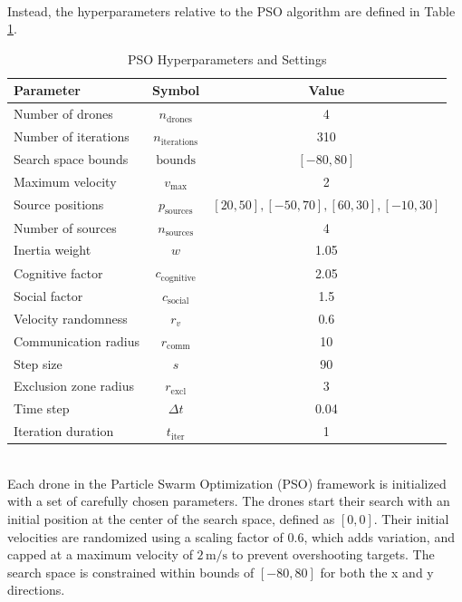\noindent\\
Instead, the hyperparameters relative to the PSO algorithm are
defined in Table \ref{tab:pso_parameters}.
\begin{table}[h!]
\centering
\caption{PSO Hyperparameters and Settings}
\begin{tabular}{|l|c|c|}
\hline
\textbf{Parameter}            & \textbf{Symbol}         & \textbf{Value} \\ \hline
Number of drones             & \(n_{\text{drones}}\)   & 4 \\ \hline
Number of iterations         & \(n_{\text{iterations}}\) & 310 \\ \hline
Search space bounds          & \(\text{bounds}\)       & \([-80, 80]\) \\ \hline
Maximum velocity             & \(v_{\text{max}}\)      & 2 \\ \hline
Source positions             & \(p_{\text{sources}}\)  & \([20, 50], [-50, 70], [60, 30], [-10, 30]\) \\ \hline
Number of sources            & \(n_{\text{sources}}\)  & 4 \\ \hline
Inertia weight               & \(w\)                  & 1.05 \\ \hline
Cognitive factor             & \(c_{\text{cognitive}}\) & 2.05 \\ \hline
Social factor                & \(c_{\text{social}}\)   & 1.5 \\ \hline
Velocity randomness          & \(r_v\)                & 0.6 \\ \hline
Communication radius         & \(r_{\text{comm}}\)     & 10 \\ \hline
Step size                    & \(s\)                  & 90 \\ \hline
Exclusion zone radius        & \(r_{\text{excl}}\)     & 3 \\ \hline
Time step                    & \(\Delta t\)           & 0.04 \\ \hline
Iteration duration           & \(t_{\text{iter}}\)     & 1 \\ \hline
\end{tabular}
\label{tab:pso_parameters}
\end{table}
\noindent\\
Each drone in the Particle Swarm Optimization (PSO) framework is 
initialized with a set of carefully chosen parameters. 
The drones start their search with an initial position at the 
center of the search space, defined as \([0, 0]\). 
Their initial velocities are randomized using a scaling factor of \(0.6\), 
which adds variation, and capped at a maximum velocity of \(2 \, \text{m/s}\) 
to prevent overshooting targets. The search space is constrained within bounds 
of \([-80, 80]\) for both the x and y directions.

